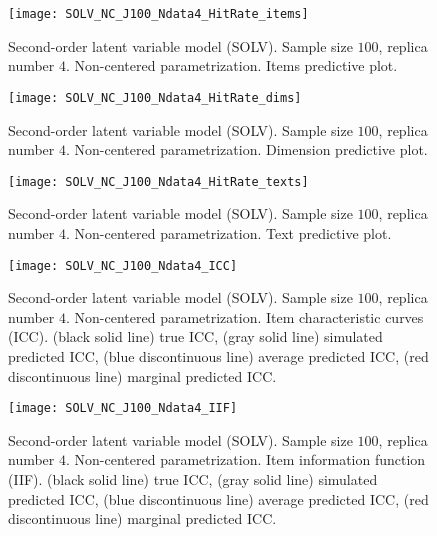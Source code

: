 %
\begin{figure}[H]
	\centering
	\texttt{[image: SOLV\_NC\_J100\_Ndata4\_HitRate\_items]}
	\caption[Second-order latent variable model (SOLV). Sample size $100$, replica number $4$. Non-centered parametrization. Items predictive plot.]%
	{Second-order latent variable model (SOLV). Sample size $100$, replica number $4$. Non-centered parametrization. Items predictive plot.}
	\label{fig:SOLV_NC_hitrate_items}
\end{figure}
%
\begin{figure}[H]
	\centering
	\texttt{[image: SOLV\_NC\_J100\_Ndata4\_HitRate\_dims]}
	\caption[Second-order latent variable model (SOLV). Sample size $100$, replica number $4$. Non-centered parametrization. Dimension predictive plot.]%
	{Second-order latent variable model (SOLV). Sample size $100$, replica number $4$. Non-centered parametrization. Dimension predictive plot.}
	\label{fig:SOLV_NC_hitrate_dim}
\end{figure}
%
\begin{figure}[H]
	\centering
	\texttt{[image: SOLV\_NC\_J100\_Ndata4\_HitRate\_texts]}
	\caption[Second-order latent variable model (SOLV). Sample size $100$, replica number $4$. Non-centered parametrization. Text predictive plot.]%
	{Second-order latent variable model (SOLV). Sample size $100$, replica number $4$. Non-centered parametrization. Text predictive plot.}
	\label{fig:SOLV_NC_hitrate_text}
\end{figure}
%
\begin{figure}[H]
	\centering
	\texttt{[image: SOLV\_NC\_J100\_Ndata4\_ICC]}
	\caption[Second-order latent variable model (SOLV). Sample size $100$, replica number $4$. Non-centered parametrization. Item characteristic curves (ICC).]%
	{Second-order latent variable model (SOLV). Sample size $100$, replica number $4$. Non-centered parametrization. Item characteristic curves (ICC). (black solid line) true ICC, (gray solid line) simulated predicted ICC, (blue discontinuous line) average predicted ICC, (red discontinuous line) marginal predicted ICC.}
	\label{fig:SOLV_CE_ICC}
\end{figure}
%
\begin{figure}[H]
	\centering
	\texttt{[image: SOLV\_NC\_J100\_Ndata4\_IIF]}
	\caption[Second-order latent variable model (SOLV). Sample size $100$, replica number $4$. Non-centered parametrization. Item information function (IIF).]%
	{Second-order latent variable model (SOLV). Sample size $100$, replica number $4$. Non-centered parametrization. Item information function (IIF). (black solid line) true ICC, (gray solid line) simulated predicted ICC, (blue discontinuous line) average predicted ICC, (red discontinuous line) marginal predicted ICC.}
	\label{fig:SOLV_CE_IIF}
\end{figure}
